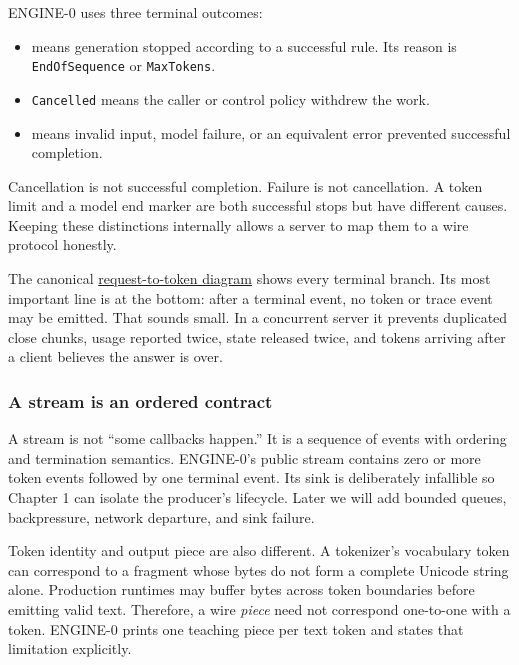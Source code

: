 \documentclass[
  10pt,
]{article}
\providecommand{\tightlist}{%
  \setlength{\itemsep}{0pt}\setlength{\parskip}{0pt}}
\begin{document}
ENGINE-0 uses three terminal outcomes:

\begin{itemize}
\tightlist
\item
  \texttt{} means generation stopped
  according to a successful rule. Its reason is \texttt{EndOfSequence}
  or \texttt{MaxTokens}.
\item
  \texttt{Cancelled} means the caller or control policy withdrew the
  work.
\item
  \texttt{} means invalid input, model
  failure, or an equivalent error prevented successful completion.
\end{itemize}

Cancellation is not successful completion. Failure is not cancellation.
A token limit and a model end marker are both successful stops but have
different causes. Keeping these distinctions internally allows a server
to map them to a wire protocol honestly.

The canonical
\href{https://github.com/hermonai/inside-the-llm-engine/blob/astra-visual-rewrite/diagrams/runtime/request-to-token.txt}{request-to-token
diagram} shows every terminal branch. Its most important line is at the
bottom: after a terminal event, no token or trace event may be emitted.
That sounds small. In a concurrent server it prevents duplicated close
chunks, usage reported twice, state released twice, and tokens arriving
after a client believes the answer is over.

\subsubsection{A stream is an ordered
contract}\label{a-stream-is-an-ordered-contract}

A stream is not ``some callbacks happen.'' It is a sequence of events
with ordering and termination semantics. ENGINE-0's public stream
contains zero or more token events followed by one terminal event. Its
sink is deliberately infallible so Chapter 1 can isolate the producer's
lifecycle. Later we will add bounded queues, backpressure, network
departure, and sink failure.

Token identity and output piece are also different. A tokenizer's
vocabulary token can correspond to a fragment whose bytes do not form a
complete Unicode string alone. Production runtimes may buffer bytes
across token boundaries before emitting valid text. Therefore, a wire
\emph{piece} need not correspond one-to-one with a token. ENGINE-0
prints one teaching piece per text token and states that limitation
explicitly.
\end{document}
